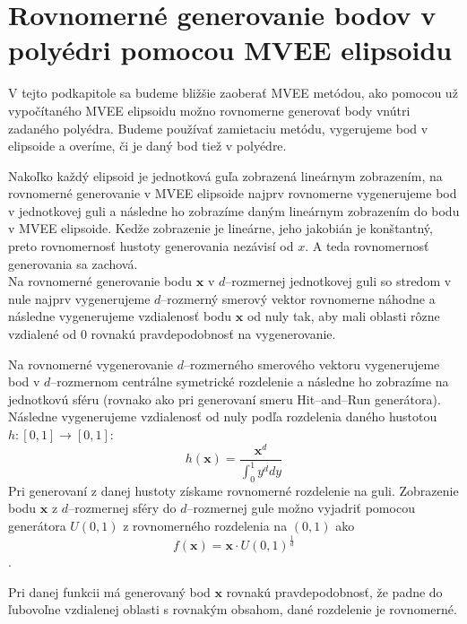 \section {Rovnomerné generovanie bodov v polyédri pomocou MVEE elipsoidu}

V tejto podkapitole sa budeme bližšie zaoberať MVEE metódou, ako pomocou už vypočítaného MVEE elipsoidu možno rovnomerne generovať body vnútri zadaného polyédra. Budeme používať zamietaciu metódu, vygerujeme bod v elipsoide a overíme, či je daný bod tiež v polyédre.

Nakoľko každý elipsoid je jednotková guľa zobrazená lineárnym zobrazením, na rovnomerné generovanie v MVEE elipsoide najprv rovnomerne vygenerujeme bod v jednotkovej guli a následne ho zobrazíme daným lineárnym zobrazením do bodu v MVEE elipsoide. Kedže zobrazenie je lineárne, jeho jakobián je konštantný, preto rovnomernosť hustoty generovania nezávisí od $x$. A teda rovnomernosť generovania sa zachová.\\
\label{generovanie_v_mvee}
Na rovnomerné generovanie bodu $\mathbf x$ v $d$--rozmernej jednotkovej guli so stredom v nule najprv vygenerujeme $d$--rozmerný smerový vektor rovnomerne náhodne a následne vygenerujeme vzdialenosť bodu $\mathbf x$ od nuly tak, aby mali oblasti rôzne vzdialené od $0$ rovnakú pravdepodobnosť na vygenerovanie.

Na rovnomerné vygenerovanie $d$--rozmerného smerového vektoru vygenerujeme bod v $d$--rozmernom centrálne symetrické rozdelenie a následne ho zobrazíme na jednotkovú sféru (rovnako ako pri generovaní smeru Hit--and--Run generátora). Následne vygenerujeme vzdialenosť od nuly podľa rozdelenia daného hustotou $h:[0,1] \rightarrow [0,1]$: $$h(\mathbf x)=\frac{\mathbf x^d}{\int_0^1 y^d dy}$$
Pri generovaní z danej hustoty získame rovnomerné rozdelenie na guli. Zobrazenie bodu $\mathbf x$ z $d$--rozmernej sféry do $d$--rozmernej gule možno vyjadriť pomocou generátora $U(0,1)$ z rovnomerného rozdelenia na $(0,1)$ ako $$f(\mathbf x)=\mathbf x\cdot U(0,1)^{\frac{1}{d}}$$.

Pri danej funkcii má generovaný bod $\mathbf x$ rovnakú pravdepodobnosť, že padne do ľubovoľne vzdialenej oblasti s rovnakým obsahom, dané rozdelenie je rovnomerné.